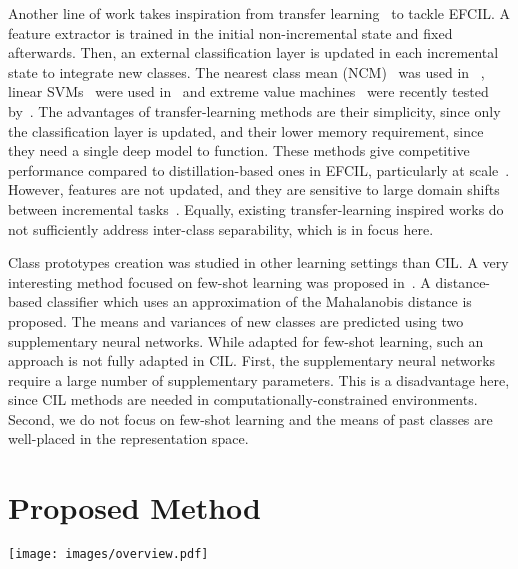 \documentclass[10pt,twocolumn,letterpaper]{article}
\makeatletter
\newcommand{\ourmodel}{FeTrIL\@\xspace}
\makeatother
\begin{document}
Another line of work takes inspiration from transfer learning~\cite{neyshabur2020being,sharif2014cnn} to tackle EFCIL.
A feature extractor is trained in the initial non-incremental state and fixed afterwards. 
Then, an external classification layer is updated in each incremental state to integrate new classes. 
The nearest class mean (NCM)~\cite{mensink2013distance} was used in ~\cite{rebuffi2017_icarl}, linear SVMs~\cite{fabian2012_scikitlearn} were used in~\cite{belouadah2018_deesil} and extreme value machines~\cite{rudd2017extreme} were recently tested by~\cite{dhamija2021self}. 
The advantages of transfer-learning methods are their simplicity, since only the classification layer is updated, and their lower memory requirement, since they need a single deep model to function.
These methods give competitive performance compared to distillation-based ones in EFCIL, particularly at scale~\cite{belouadah2021_study}.
However, features are not updated, and they are sensitive to large domain shifts between incremental tasks~\cite{lange2019}. 
Equally, existing transfer-learning inspired works do not sufficiently address inter-class separability, which is in focus here. 


Class prototypes creation was studied in other learning settings than CIL.
A very interesting method focused on few-shot learning was proposed in~\cite{das2019two}. 
A distance-based classifier which uses an approximation of the Mahalanobis distance is proposed.
The means and variances of new classes are predicted using two supplementary neural networks. 
While adapted for few-shot learning, such an approach is not fully adapted in CIL.
First, the supplementary neural networks require a large number of supplementary parameters. 
This is a disadvantage here, since CIL methods are needed in computationally-constrained environments. 
Second, we do not focus on few-shot learning and the means of past classes are well-placed in the representation space. 

\section{Proposed Method}
\label{sec:method}

\begin{figure*}[t]
	\centering
\texttt{[image: images/overview.pdf]} \caption{\ourmodel overview for a toy example with an initial state (3 classes) and two incremental states (1 class per state). The feature extractor  is trained in the initial state, using sets of data , and then frozen afterwards. The generator  uses features  of the new class extracted with  and prototypes of past classes  to generate pseudo-features of past classes  in the  state. Prototypes () are the centroids of all classes (past and new). They are learned when classes are first seen and then stored throughout the IL process. A linear classifier  is used to learn classification weights  for all seen classes (past and new).   
	}
	\vspace{-4mm}
	\label{fig:overview}
\end{figure*}
\end{document}

